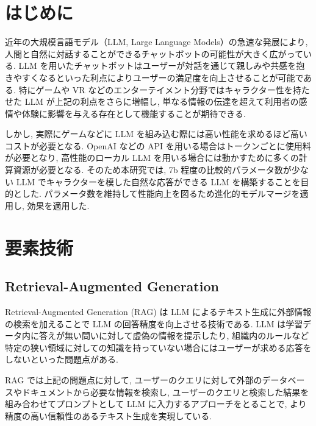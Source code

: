 \documentclass[twocolumn]{jarticle}
\begin{document}

\section{はじめに}
近年の大規模言語モデル（LLM, Large Language Models）の急速な発展により, 人間と自然に対話することができるチャットボットの可能性が大きく広がっている. 
LLM を用いたチャットボットはユーザーが対話を通じて親しみや共感を抱きやすくなるといった利点によりユーザーの満足度を向上させることが可能である. 特にゲームや VR などのエンターテイメント分野ではキャラクター性を持たせた LLM が上記の利点をさらに増幅し, 単なる情報の伝達を超えて利用者の感情や体験に影響を与える存在として機能することが期待できる.\par
しかし, 実際にゲームなどに LLM を組み込む際には高い性能を求めるほど高いコストが必要となる. OpenAI などの API を用いる場合はトークンごとに使用料が必要となり, 高性能のローカル LLM を用いる場合には動かすために多くの計算資源が必要となる. そのため本研究では, 7b 程度の比較的パラメータ数が少ない LLM でキャラクターを模した自然な応答ができる LLM を構築することを目的とした. パラメータ数を維持して性能向上を図るため進化的モデルマージを適用し, 効果を適用した. 
\section{要素技術}

\subsection{Retrieval-Augmented Generation}
Retrieval-Augmented Generation (RAG)\cite{RAG} は LLM によるテキスト生成に外部情報の検索を加えることで LLM の回答精度を向上させる技術である. LLM は学習データ内に答えが無い問いに対して虚偽の情報を提示したり, 組織内のルールなど特定の狭い領域に対しての知識を持っていない場合にはユーザーが求める応答をしないといった問題点がある. \par
RAG では上記の問題点に対して, ユーザーのクエリに対して外部のデータベースやドキュメントから必要な情報を検索し, ユーザーのクエリと検索した結果を組み合わせてプロンプトとして LLM に入力するアプローチをとることで, より精度の高い信頼性のあるテキスト生成を実現している.
\end{document}
